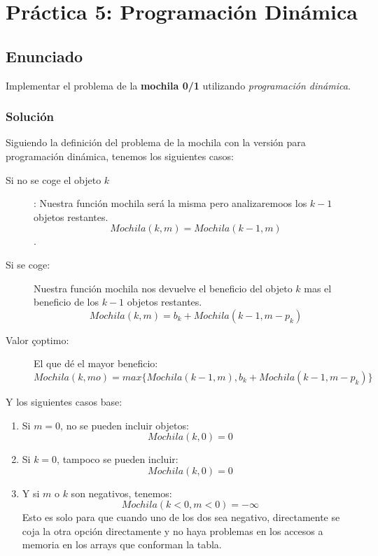 \documentclass[10pt,a4paper,spanish]{report}
\begin{document}
\chapter{\textcolor[rgb]{0.1,0.2,1}Práctica 5: Programación Dinámica}

\section{\textcolor[rgb]{0.1,0.2,1}Enunciado}

Implementar el problema de la \textbf{\textcolor[rgb]{0.1,0.2,1}{mochila 0/1}} utilizando \textit{\textcolor[rgb]{0.1,0.2,1}{programación dinámica}}.

\subsection{\textcolor[rgb]{0.1,0.2,1}Solución}

Siguiendo la definición del problema de la mochila con la versión para programación dinámica, tenemos los siguientes casos:

\begin{description}
  \item [Si no se coge el objeto $k$]: Nuestra función mochila será la misma pero analizaremoos los $k-1$ objetos restantes.
  $$Mochila(k,m) = Mochila(k-1,m)$$.
  \item [Si se coge:] Nuestra función mochila nos devuelve el beneficio del objeto $k$ mas el beneficio de los $k-1$ objetos restantes.
  $$Mochila(k,m) = b_k + Mochila(k-1, m-p_k)$$
  \item [Valor çoptimo:] El que dé el mayor beneficio:
  $$Mochila(k,mo) = max\{Mochila(k-1,m), b_k + Mochila(k-1, m-p_k)\}$$
\end{description}

Y los siguientes casos base:

\begin{enumerate}[---]
  \item Si $m=0$, no se pueden incluir objetos:
  $$Mochila(k,0) = 0$$
  \item Si $k=0$, tampoco se pueden incluir:
  $$Mochila(k,0) = 0$$
  \item Y si $m$ o $k$ son negativos, tenemos:
  $$Mochila(k<0,m<0) = -\infty$$
  Esto es solo para que cuando uno de los dos sea negativo, directamente se coja la otra opción directamente y no haya problemas en los accesos a memoria en los arrays que conforman la tabla.
\end{enumerate}
\end{document}
